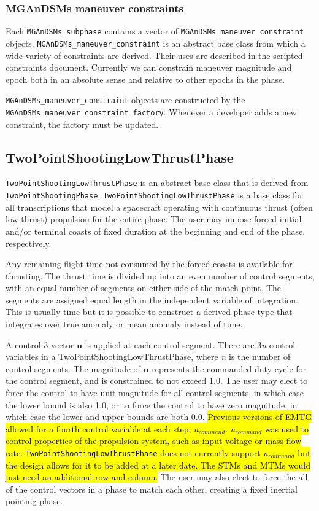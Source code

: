 \subsubsection{MGAnDSMs maneuver constraints}
\label{subsubsec:MGAnDSMs_maneuver_constraints}

Each \texttt{MGAnDSMs\_subphase} contains a vector of \texttt{MGAnDSMs\_maneuver\_constraint} objects. \texttt{MGAnDSMs\_maneuver\_constraint} is an abstract base class from which a wide variety of constraints are derived. Their uses are described in the scripted constraints document. Currently we can constrain maneuver magnitude and epoch both in an absolute sense and relative to other epochs in the phase.

\texttt{MGAnDSMs\_maneuver\_constraint} objects are constructed by the \texttt{MGAnDSMs\_maneuver\_constraint\_factory}. Whenever a developer adds a new constraint, the factory must be updated.

\subsection{TwoPointShootingLowThrustPhase}
\label{subsec:TwoPointShootingLowThrustPhase}

\texttt{TwoPointShootingLowThrustPhase} is an abstract base class that is derived from \texttt{TwoPointShootingPhase}. \texttt{TwoPointShootingLowThrustPhase} is a base class for all transcriptions that model a spacecraft operating with continuous thrust (often low-thrust) propulsion for the entire phase. The user may impose forced initial and/or terminal coasts of fixed duration at the beginning and end of the phase, respectively.

Any remaining flight time not consumed by the forced coasts is available for thrusting. The thrust time is divided up into an even number of control segments, with an equal number of segments on either side of the match point. The segments are assigned equal length in the independent variable of integration. This is usually time but it is possible to construct a derived phase type that integrates over true anomaly or mean anomaly instead of time.

A control 3-vector $\mathbf{u}$ is applied at each control segment. There are 3\textit{n} control variables in a TwoPointShootingLowThrustPhase, where \textit{n} is the number of control segments. The magnitude of $\mathbf{u}$ represents the commanded duty cycle for the control segment, and is constrained to not exceed 1.0. The user may elect to force the control to have unit magnitude for all control segments, in which case the lower bound is also 1.0, or to force the control to have zero magnitude, in which case the lower and upper bounds are both 0.0. \hl{Previous versions of EMTG allowed for a fourth control variable at each step, $u_{command}$. $u_{command}$ was used to control properties of the propulsion system, such as input voltage or mass flow rate. \texttt{TwoPointShootingLowThrustPhase} does not currently support $u_{command}$ but the design allows for it to be added at a later date. The STMs and MTMs would just need an additional row and column.} The user may also elect to force the all of the control vectors in a phase to match each other, creating a fixed inertial pointing phase.

